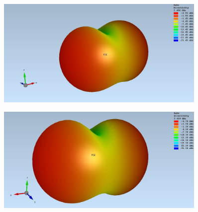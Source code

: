 \begin{figure}
	\begin{center}
		\includegraphics[width=0.9\textwidth]{content/bilder/Evaluation/Loop/Mit1ABS/EM_Far_Filed_Loop_Coil_1ABS.JPG}
		\label{fig:sim_Loop_3Fach_1ABS_3D}
	\end{center}
\end{figure}
\begin{figure}
	\begin{center}
		\includegraphics[width=0.9\textwidth]{content/bilder/Evaluation/Loop/Kurz3/EMFraField_Loop_2ABS_kurz3.JPG}
		\label{fig:sim_Loop_3Fach_2ABS_3D}
	\end{center}
\end{figure}
\clearpage



